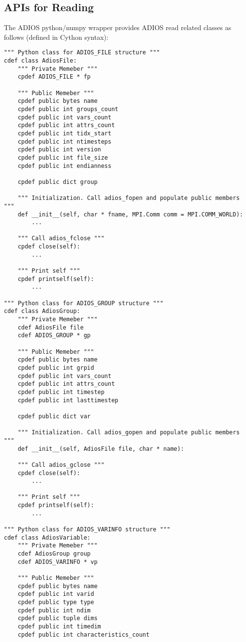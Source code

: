 \subsection{APIs for Reading}
The ADIOS python/numpy wrapper provides ADIOS read related classes as follows (defined in Cython syntax):
\begin{lstlisting}[language=cython,caption={Write functions},label={},]
""" Python class for ADIOS_FILE structure """
cdef class AdiosFile:
    """ Private Memeber """
    cpdef ADIOS_FILE * fp

    """ Public Memeber """
    cpdef public bytes name
    cpdef public int groups_count
    cpdef public int vars_count
    cpdef public int attrs_count
    cpdef public int tidx_start
    cpdef public int ntimesteps
    cpdef public int version
    cpdef public int file_size
    cpdef public int endianness
    
    cpdef public dict group
    
    """ Initialization. Call adios_fopen and populate public members """
    def __init__(self, char * fname, MPI.Comm comm = MPI.COMM_WORLD):
        ...
    
    """ Call adios_fclose """
    cpdef close(self):
        ...
        
    """ Print self """
    cpdef printself(self):
        ...

""" Python class for ADIOS_GROUP structure """
cdef class AdiosGroup:
    """ Private Memeber """
    cdef AdiosFile file
    cdef ADIOS_GROUP * gp

    """ Public Memeber """
    cpdef public bytes name
    cpdef public int grpid
    cpdef public int vars_count
    cpdef public int attrs_count
    cpdef public int timestep
    cpdef public int lasttimestep
    
    cpdef public dict var
    
    """ Initialization. Call adios_gopen and populate public members """
    def __init__(self, AdiosFile file, char * name):

    """ Call adios_gclose """
    cpdef close(self):
        ...
        
    """ Print self """
    cpdef printself(self):
        ...

""" Python class for ADIOS_VARINFO structure """
cdef class AdiosVariable:
    """ Private Memeber """
    cdef AdiosGroup group
    cdef ADIOS_VARINFO * vp

    """ Public Memeber """
    cpdef public bytes name
    cpdef public int varid
    cpdef public type type
    cpdef public int ndim
    cpdef public tuple dims
    cpdef public int timedim
    cpdef public int characteristics_count
    

\end{lstlisting}
